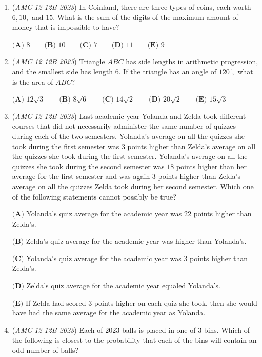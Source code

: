\begin{enumerate}
	\item (\textit{AMC 12 12B 2023}) In Coinland, there are three types of coins, each worth $6, 10,$ and $15.$ What is the sum of the digits of the maximum amount of money that is impossible to have?


 $\textbf{(A) }8\qquad\textbf{(B) }10\qquad\textbf{(C) }7\qquad\textbf{(D) }11\qquad\textbf{(E) }9$


	\item (\textit{AMC 12 12B 2023}) Triangle $ABC$ has side lengths in arithmetic progression, and the smallest side has length $6$. If the triangle has an angle of $120^\circ,$ what is the area of $ABC$?


 $\textbf{(A) }12\sqrt{3}\qquad\textbf{(B) }8\sqrt{6}\qquad\textbf{(C) }14\sqrt{2}\qquad\textbf{(D) }20\sqrt{2}\qquad\textbf{(E) }15\sqrt{3}$


	\item (\textit{AMC 12 12B 2023}) ﻿Last academic year Yolanda and Zelda took different courses that did not necessarily administer the same number of quizzes during each of the two semesters. Yolanda's average on all the quizzes she took during the first semester was $3$ points higher than Zelda's average on all the quizzes she took during the first semester. Yolanda's average on all the quizzes she took during the second semester was $18$ points higher than her average for the first semester and was again $3$ points higher than Zelda's average on all the quizzes Zelda took during her second semester. Which one of the following statements cannot possibly be true?


 $\textbf{(A)}$ Yolanda's quiz average for the academic year was $22$ points higher than Zelda's.


 $\textbf{(B)}$ Zelda's quiz average for the academic year was higher than Yolanda's.


 $\textbf{(C)}$ Yolanda's quiz average for the academic year was $3$ points higher than Zelda's.


 $\textbf{(D)}$ Zelda's quiz average for the academic year equaled Yolanda's.


 $\textbf{(E)}$ If Zelda had scored $3$ points higher on each quiz she took, then she would have had the same average for the academic year as Yolanda.


 

	\item (\textit{AMC 12 12B 2023}) Each of $2023$ balls is placed in one of $3$ bins. Which of the following is closest to the probability that each of the bins will contain an odd number of balls?



\end{enumerate}
